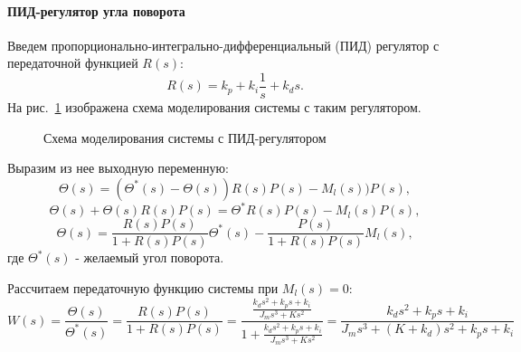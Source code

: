 \paragraph*{ПИД-регулятор угла поворота\\}
\hspace*{\parindent}Введем пропорционально-интегрально-дифференциальный (ПИД) регулятор с передаточной функцией $R(s)$:
\begin{equation}
	R(s)=k_p+k_i\frac{1}{s}+k_ds.
\end{equation}
На рис.~\ref{pid} изображена схема моделирования системы с таким регулятором.

\begin{figure}[h]
	\noindent{}
	\caption{Схема моделирования системы с ПИД-регулятором}
	\label{pid}
\end{figure}

\hspace*{\parindent}Выразим из нее выходную переменную:
\begin{equation}
	\Theta(s)=(\Theta^*(s)-\Theta(s))R(s)P(s)-M_l(s))P(s),
\end{equation}
\begin{equation}
	\Theta(s)+\Theta(s)R(s)P(s)=\Theta^*R(s)P(s)-M_l(s)P(s),
\end{equation}
\begin{equation}
	\Theta(s)=\frac{R(s)P(s)}{1+R(s)P(s)}\Theta^*(s)-\frac{P(s)}{1+R(s)P(s)}M_l(s),
\end{equation}
где $\Theta^*(s)$ - желаемый угол поворота.

Рассчитаем передаточную функцию системы при $M_l(s)=0$:
\begin{equation}\label{pidfunc}
	W(s)=\frac{\Theta(s)}{\Theta^*(s)}=\frac{R(s)P(s)}{1+R(s)P(s)}=\frac{\frac{k_ds^2+k_ps+k_i}{J_ms^3+Ks^2}}{1+\frac{k_ds^2+k_ps+k_i}{J_ms^3+Ks^2}}=\frac{k_ds^2+k_ps+k_i}{J_ms^3+(K+k_d)s^2+k_ps+k_i}
\end{equation}

